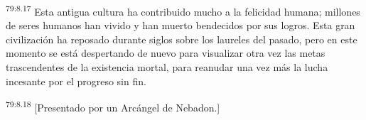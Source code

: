 \par
\textsuperscript{79:8.17} Esta antigua cultura ha contribuido mucho a la felicidad humana; millones de seres humanos han vivido y han muerto bendecidos por sus logros. Esta gran civilización ha reposado durante siglos sobre los laureles del pasado, pero en este momento se está despertando de nuevo para visualizar otra vez las metas trascendentes de la existencia mortal, para reanudar una vez más la lucha incesante por el progreso sin fin.

\par
\textsuperscript{79:8.18} [Presentado por un Arcángel de Nebadon.]